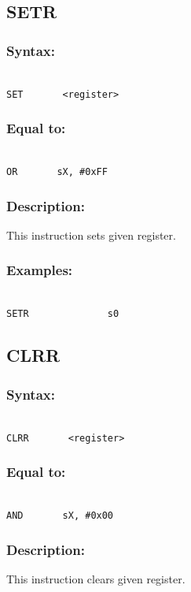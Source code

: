     \subsection{SETR}
        \subsubsection{Syntax:}
        {
            ~\\
            \usecodefont
            \verb'SET       <register>'
        }
        \subsubsection{Equal to:}
        {
            ~\\
            \usecodefont
            \verb'OR       sX, #0xFF'
        }
        \subsubsection{Description:}
            This instruction sets given register.

        \subsubsection{Examples:}
        {
            ~\\
            \usecodefont
            \verb'SETR              s0'\\
        }

    \subsection{CLRR}
        \subsubsection{Syntax:}
        {
            ~\\
            \usecodefont
            \verb'CLRR       <register>'
        }
        \subsubsection{Equal to:}
        {
            ~\\
            \usecodefont
            \verb'AND       sX, #0x00'
        }
        \subsubsection{Description:}
            This instruction clears given register.

